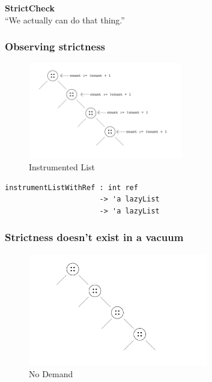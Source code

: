 \documentclass{beamer}
\begin{document}
\begin{frame}
\Huge\centering\textbf{StrictCheck}\vspace{.15\baselineskip}\\
\Large\centering``We actually can do that thing.''
\end{frame}

\begin{frame}[fragile]
\frametitle{Observing strictness}
\begin{figure}
\centering
\includegraphics[width=0.6\textwidth]{instrumentListWithRef}
\caption{Instrumented List}
\end{figure}
\begin{verbatim}
instrumentListWithRef : int ref
                      -> 'a lazyList
                      -> 'a lazyList
\end{verbatim}
\end{frame}


\begin{frame}[fragile]
\frametitle{Strictness doesn't exist in a vacuum}
\begin{figure}
\centering
\includegraphics[width=0.7\textwidth]{noDemand}
\caption{No Demand}
\end{figure}
\end{frame}
\end{document}
